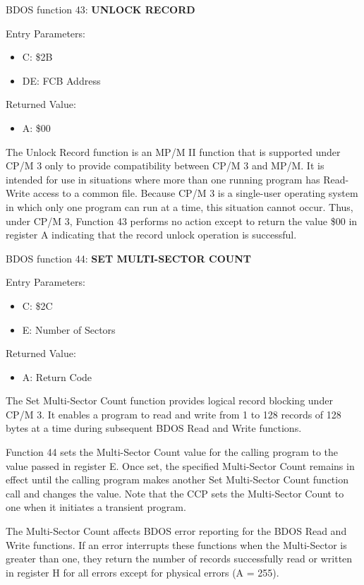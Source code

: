 BDOS function 43: \textbf{UNLOCK RECORD}

Entry Parameters:
\begin{itemize}
\item[] C: \$2B
\item[] DE: FCB Address
\end{itemize}

Returned Value:
\begin{itemize}
\item[] A: \$00
\end{itemize}

The Unlock Record function is an MP/M II function that is supported
under CP/M 3 only to provide compatibility between CP/M 3 and MP/M. It
is intended for use in situations where more than one running program
has Read-Write access to a common file. Because CP/M 3 is a
single-user operating system in which only one program can run at a
time, this situation cannot occur. Thus, under CP/M 3, Function 43
performs no action except to return the value \$00 in register A
indicating that the record unlock operation is successful.

BDOS function 44: \textbf{SET MULTI-SECTOR COUNT}

Entry Parameters:
\begin{itemize}
\item[] C: \$2C
\item[] E: Number of Sectors
\end{itemize}

Returned Value:
\begin{itemize}
\item[] A: Return Code
\end{itemize}

The Set Multi-Sector Count function provides logical record blocking
under CP/M 3. It enables a program to read and write from 1 to 128
records of 128 bytes at a time during subsequent BDOS Read and Write
functions.

Function 44 sets the Multi-Sector Count value for the calling program
to the value passed in register E. Once set, the specified
Multi-Sector Count remains in effect until the calling program makes
another Set Multi-Sector Count function call and changes the
value. Note that the CCP sets the Multi-Sector Count to one when it
initiates a transient program.

The Multi-Sector Count affects BDOS error reporting for the BDOS Read
and Write functions. If an error interrupts these functions when the
Multi-Sector is greater than one, they return the number of records
successfully read or written in register H for all errors except for
physical errors (A = 255).

